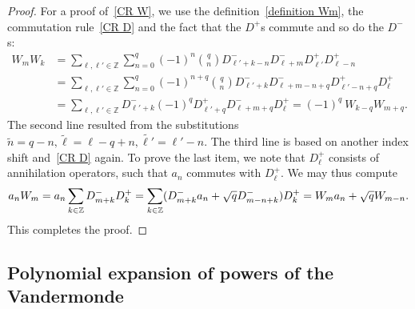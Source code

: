 \documentclass[letterpaper, DIV=17]{scrartcl}
\numberwithin{equation}{section}
\theoremstyle{definition}
\begin{document}
\begin{proof}
			
			For a proof of~\eqref{CR W}, we use the definition~\eqref{definition Wm}, the commutation rule~\ref{CR D} and the fact that the $D^+ $s commute and so do the $ D^-  $s:			\begin{align*}
			W_m W_k  & = \sum_{\ell , \ell' \in \mathbb{Z} }  \sum_{n=0}^q (-1)^n \binom{q}{n}   D_{\ell'+k-n}^- D_{\ell+m}^-  D_{\ell'}^+ D_{\ell-n}^+  \\
			& =\sum_{\ell , \ell' \in \mathbb{Z} }   \sum_{n=0}^q (-1)^{n+q} \binom{q}{n}   D_{\ell'+k}^- D_{\ell+m -n+q }^-  D_{\ell'-n+q}^+ D_{\ell}^+ \\
			& = \sum_{\ell , \ell' \in \mathbb{Z} }  D_{\ell'+k}^- (-1)^q D_{\ell'+q}^+D_{\ell+m +q }^- D_{\ell}^+ = (-1)^q \ W_{k-q} W_{m+q} . 
			\end{align*}
			The second line resulted from the substitutions $\tilde{n}=q-n, \tilde{\ell}=\ell-q+n, \widetilde{\ell'}=\ell'-n$. The third line is based on another index shift and~\ref{CR D} again.
			To prove the last item, we note that 
			$D_\ell^+$ consists of annihilation operators,  such that $a_n$ commutes with $D_\ell^+$. We may thus compute
			\begin{equation*} 
					a_n W_m = a_n \sum_{k\in \mathbb{Z}} D_{m+k}^- D_k^+ 
					= \sum_{k\in \mathbb{Z}} (D_{m+k}^- a_n + \sqrt{q} D_{m-n+k}^-) D_k^+ \\
					= W_m a_n + \sqrt{q} W_{m-n}.
			\end{equation*}
			This completes the proof.
			\end{proof}

			

		
	
		 
		 
\subsection{Polynomial expansion of powers of the Vandermonde}
		 
\end{document}
